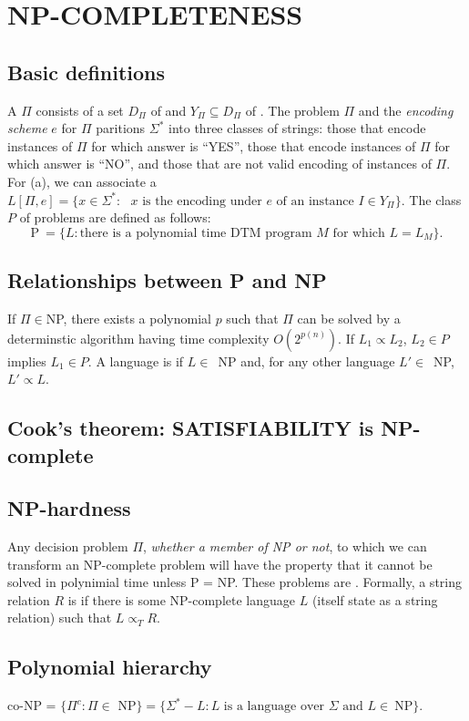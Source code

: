 \section{NP-COMPLETENESS}
\subsection{Basic definitions}
\bit
\w A  $\Pi$ consists of a set $D_\Pi$ of 
and $Y_\Pi \subseteq D_\Pi$ of .
\w The problem $\Pi$ and the {\em encoding scheme} $e$ for $\Pi$ paritions
$\Sigma^*$ into three classes of strings:
   \ben
   \w [(a)] those that encode instances of $\Pi$ for which answer is ``YES'',
   \w [(b)] those that encode instances of $\Pi$ for which answer is ``NO'',
   and
   \w [(c)] those that are not valid encoding of instances of $\Pi$.
   \een
\w For (a), we can associate a 
  $L[\Pi, e] = \{x \in \Sigma^*: \mbox{\ $x$ is the encoding under $e$ of an
    instance $I \in Y_\Pi$}\}.$
\w The class $P$ of problems are defined as follows:
  \[ \mbox{P}\ = \{L: \mbox{there is a polynomial time DTM program $M$ for
    which $L = L_M$}\}.\]
\eit

\subsection{Relationships between P and NP}
\bit
\w If $\Pi \in $NP, there exists a polynomial $p$ such that $\Pi$ can be
solved by a determinstic algorithm having time complexity $O(2^{p(n)})$.
\w If $L_1 \propto L_2$, $L_2 \in P$ implies $L_1 \in P$.
\w A language is  if $L \in $\ NP and, for any other language
$L' \in $\ NP,\  $L' \propto L$.
\eit

\subsection{Cook's theorem: SATISFIABILITY is NP-complete}

\subsection{NP-hardness}
\bit
\w Any decision problem $\Pi$, {\em whether a member of NP or not}, to which
we can transform an NP-complete problem will have the property that it cannot
be solved in polynimial time unless P = NP. These problems are .
\w Formally, a string relation $R$ is  if there is some
NP-complete language $L$ (itself state as a string relation) such that $L
\propto_T R$. 
\eit

\subsection{Polynomial hierarchy}
\bit
\w co-NP = $\{\Pi^c: \Pi \in \mbox{\ NP}\} =
   \{\Sigma^* - L: L \mbox{\ is a language over\ } \Sigma \mbox{\ and\ }
   L \in\ \mbox{NP}\}$.
\eit